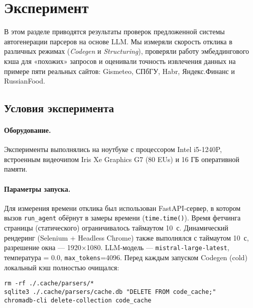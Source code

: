 \section{Эксперимент}
\label{subsec:results}

В этом разделе приводятся результаты проверок предложенной системы автогенерации парсеров на основе LLM. Мы измеряли скорость отклика в различных режимах (\emph{Codegen} и \emph{Structuring}), проверяли работу эмбеддингового кэша для «похожих» запросов и оценивали точность извлечения данных на примере пяти реальных сайтов: Gismeteo, СПбГУ, Habr, Яндекс.Финанс и RussianFood.

\subsection{Условия эксперимента}

\paragraph{Оборудование.}
Эксперименты выполнялись на ноутбуке с процессором Intel i5-1240P, встроенным видеочипом Iris Xe Graphics G7 (80 EUs) и 16 ГБ оперативной памяти.

\paragraph{Параметры запуска.}
Для измерения времени отклика был использован FastAPI-сервер, в котором вызов \texttt{run\_agent} обёрнут в замеры времени (\texttt{time.time()}). Время фетчинга страницы (статического) ограничивалось таймаутом 10~с. Динамический рендеринг (Selenium + Headless Chrome) также выполнялся с таймаутом 10~с, разрешение окна — 1920×1080. LLM-модель — \texttt{mistral-large-latest}, температура = 0.0, \texttt{max\_tokens}=4096. Перед каждым запуском Codegen (cold) локальный кэш полностью очищался:
\begin{verbatim}
rm -rf ./.cache/parsers/*
sqlite3 ./.cache/parsers/cache.db "DELETE FROM code_cache;"
chromadb-cli delete-collection code_cache
\end{verbatim}

